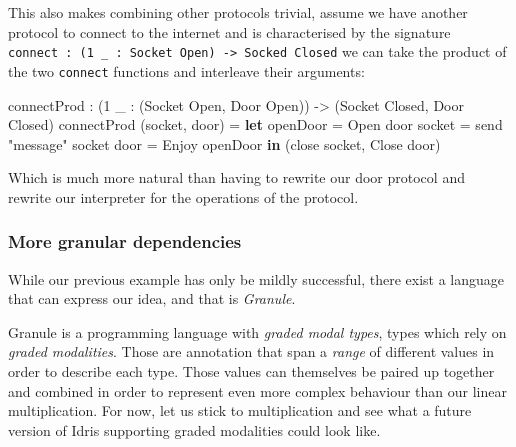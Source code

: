 \documentclass[
]{article}
\newenvironment{Shaded}{}{}
\newcommand{\DataTypeTok}[1]{\textcolor[rgb]{0.56,0.13,0.00}{#1}}
\newcommand{\DecValTok}[1]{\textcolor[rgb]{0.25,0.63,0.44}{#1}}
\newcommand{\KeywordTok}[1]{\textcolor[rgb]{0.00,0.44,0.13}{\textbf{#1}}}
\newcommand{\NormalTok}[1]{#1}
\newcommand{\OperatorTok}[1]{\textcolor[rgb]{0.40,0.40,0.40}{#1}}
\newcommand{\OtherTok}[1]{\textcolor[rgb]{0.00,0.44,0.13}{#1}}
\newcommand{\StringTok}[1]{\textcolor[rgb]{0.25,0.44,0.63}{#1}}
\begin{document}
This also makes combining other protocols trivial, assume we have
another protocol to connect to the internet and is characterised by the
signature
\texttt{connect\ :\ (1\ \_\ :\ Socket\ Open)\ -\textgreater{}\ Socked\ Closed}
we can take the product of the two \texttt{connect} functions and
interleave their arguments:

\begin{Shaded}
\begin{Highlighting}[]
\NormalTok{connectProd }\OperatorTok{:}\NormalTok{ (}\DecValTok{1}\NormalTok{ \_ }\OperatorTok{:}\NormalTok{ (}\DataTypeTok{Socket} \DataTypeTok{Open}\NormalTok{, }\DataTypeTok{Door} \DataTypeTok{Open}\NormalTok{)) }
           \OtherTok{{-}\textgreater{}}\NormalTok{ (}\DataTypeTok{Socket} \DataTypeTok{Closed}\NormalTok{, }\DataTypeTok{Door} \DataTypeTok{Closed}\NormalTok{)}
\NormalTok{connectProd (socket, door) }\OtherTok{=} 
  \KeywordTok{let}\NormalTok{ openDoor }\OtherTok{=} \DataTypeTok{Open}\NormalTok{ door}
\NormalTok{      socket\textquotesingle{} }\OtherTok{=}\NormalTok{ send }\StringTok{"message"}\NormalTok{ socket}
\NormalTok{      door\textquotesingle{} }\OtherTok{=} \DataTypeTok{Enjoy}\NormalTok{ openDoor }\KeywordTok{in}
\NormalTok{      (close socket\textquotesingle{}, }\DataTypeTok{Close}\NormalTok{ door\textquotesingle{})}
\end{Highlighting}
\end{Shaded}

Which is much more natural than having to rewrite our door protocol and
rewrite our interpreter for the operations of the protocol.

\hypertarget{more-granular-dependencies}{%
\subsubsection{More granular
dependencies}\label{more-granular-dependencies}}

While our previous example has only be mildly successful, there exist a
language that can express our idea, and that is \emph{Granule}.

Granule is a programming language with \emph{graded modal types}, types
which rely on \emph{graded modalities}. Those are annotation that span a
\emph{range} of different values in order to describe each type. Those
values can themselves be paired up together and combined in order to
represent even more complex behaviour than our linear multiplication.
For now, let us stick to multiplication and see what a future version of
Idris supporting graded modalities could look like.
\end{document}
